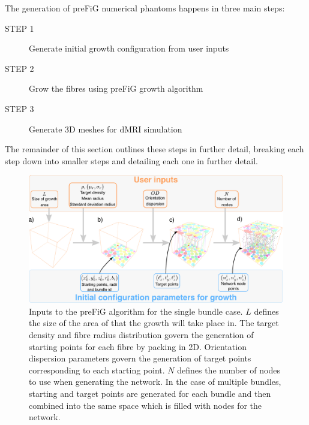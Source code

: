 The generation of \ac{preFiG} numerical phantoms happens in three main steps:
\begin{description}
  \item [STEP 1] \label{item:step1} Generate initial growth configuration from user inputs
  \item [STEP 2] Grow the fibres using \ac{preFiG} growth algorithm
  \item [STEP 3] Generate 3D meshes for dMRI simulation
\end{description}

The remainder of this section outlines these steps in further detail, breaking each step down into smaller steps and detailing each one in further detail. 

\begin{figure}[t]
  \centering
  \includegraphics[width=\textwidth]{figures/config/method_inputs_only.eps}
  \caption[Inputs to the \ac{preFiG} algorithm]{Inputs to the \ac{preFiG} algorithm for the single bundle case. $L$ defines the size of the area of that the growth will take place in. The target density and fibre radius distribution govern the generation of starting points for each fibre by packing in 2D. Orientation dispersion parameters govern the generation of target points corresponding to each starting point. $N$ defines the number of nodes to use when generating the network. In the case of multiple bundles, starting and target points are generated for each bundle and then combined into the same space which is filled with nodes for the network. }
  \label{fig:ipmi_inputs}
\end{figure}

